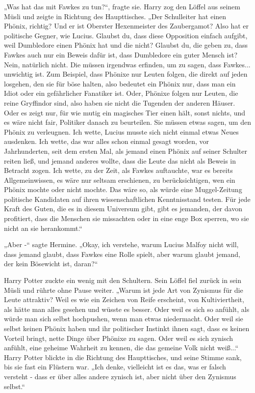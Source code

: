 {„Was hat das mit Fawkes zu tun?“, fragte sie. Harry zog den Löffel aus seinem Müsli und zeigte in Richtung des Haupttisches. „Der Schulleiter hat einen Phönix, richtig? Und er ist Oberster Hexenmeister des Zaubergamot? Also hat er politische Gegner, wie Lucius. Glaubst du, dass diese Opposition einfach aufgibt, weil Dumbledore einen Phönix hat und die nicht? Glaubst du, die geben zu, dass Fawkes auch nur ein Beweis dafür ist, dass Dumbledore ein guter Mensch ist? Nein, natürlich nicht. Die müssen irgendwas erfinden, um zu sagen, dass Fawkes... unwichtig ist. Zum Beispiel, dass Phönixe nur Leuten folgen, die direkt auf jeden losgehen, den sie für böse halten, also bedeutet ein Phönix nur, dass man ein Idiot oder ein gefährlicher Fanatiker ist. Oder, Phönixe folgen nur Leuten, die reine Gryffindor sind, also haben sie nicht die Tugenden der anderen Häuser. Oder es zeigt nur, für wie mutig ein magisches Tier einen hält, sonst nichts, und es wäre nicht fair, Politiker danach zu beurteilen. Sie müssen etwas sagen, um den Phönix zu verleugnen. Ich wette, Lucius musste sich nicht einmal etwas Neues ausdenken. Ich wette, das war alles schon einmal gesagt worden, vor Jahrhunderten, seit dem ersten Mal, als jemand einen Phönix auf seiner Schulter reiten ließ, und jemand anderes wollte, dass die Leute das nicht als Beweis in Betracht zogen. Ich wette, zu der Zeit, als Fawkes auftauchte, war es bereits Allgemeinwissen, es wäre nur seltsam erschienen, zu berücksichtigen, wen ein Phönix mochte oder nicht mochte. Das wäre so, als würde eine Muggel-Zeitung politische Kandidaten auf ihren wissenschaftlichen Kenntnisstand testen. Für jede Kraft des Guten, die es in diesem Universum gibt, gibt es jemanden, der davon profitiert, dass die Menschen sie missachten oder in eine enge Box sperren, wo sie nicht an sie herankommt.“

„Aber -“ sagte Hermine. „Okay, ich verstehe, warum Lucius Malfoy nicht will, dass jemand glaubt, dass Fawkes eine Rolle spielt, aber warum glaubt jemand, der kein Bösewicht ist, daran?“

Harry Potter zuckte ein wenig mit den Schultern. Sein Löffel fiel zurück in sein Müsli und rührte ohne Pause weiter. „Warum ist jede Art von Zynismus für die Leute attraktiv? Weil es wie ein Zeichen von Reife erscheint, von Kultiviertheit, als hätte man alles gesehen und wüsste es besser. Oder weil es sich so anfühlt, als würde man sich selbst hochpushen, wenn man etwas niedermacht. Oder weil sie selbst keinen Phönix haben und ihr politischer Instinkt ihnen sagt, dass es keinen Vorteil bringt, nette Dinge über Phönixe zu sagen. Oder weil es sich zynisch anfühlt, eine geheime Wahrheit zu kennen, die das gemeine Volk nicht weiß...“ Harry Potter blickte in die Richtung des Haupttisches, und seine Stimme sank, bis sie fast ein Flüstern war. „Ich denke, vielleicht ist es das, was er falsch versteht - dass er über alles andere zynisch ist, aber nicht über den Zynismus selbst.“

}
